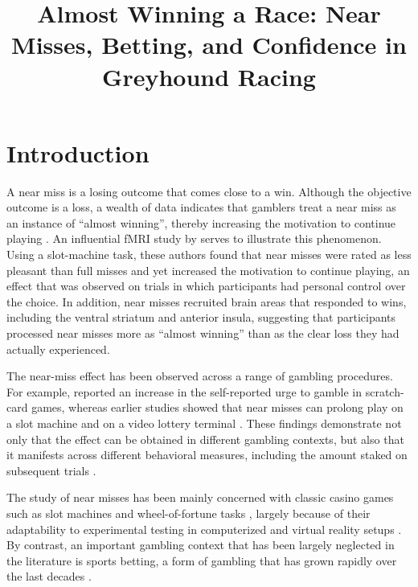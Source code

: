 \documentclass[man,floatsintext,donotrepeattitle]{apa7}
\title{Almost Winning a Race: Near Misses, Betting, and Confidence in Greyhound Racing}
\begin{document}
\maketitle

\section{Introduction}

A near miss is a losing outcome that comes close to a win. Although the objective outcome is a loss, a wealth of data indicates that gamblers treat a near miss as an instance of ``almost winning'', thereby increasing the motivation to continue playing \parencite{reid1986, dixonschreiber2004, habibdixon2010, billieux2012, barton2017}. An influential fMRI study by \textcite{clark2009} serves to illustrate this phenomenon. Using a slot-machine task, these authors found that near misses were rated as less pleasant than full misses and yet increased the motivation to continue playing, an effect that was observed on trials in which participants had personal control over the choice. In addition, near misses recruited brain areas that responded to wins, including the ventral striatum and anterior insula, suggesting that participants processed near misses more as ``almost winning'' than as the clear loss they had actually experienced.

The near-miss effect has been observed across a range of gambling procedures. For example, \textcite{stange2017} reported an increase in the self-reported urge to gamble in scratch-card games, whereas earlier studies showed that near misses can prolong play on a slot machine \parencite{kassinove2001} and on a video lottery terminal \parencite{cote2003}. These findings demonstrate not only that the effect can be obtained in different gambling contexts, but also that it manifests across different behavioral measures, including the amount staked on subsequent trials \parencite{palmer2024}.

The study of near misses has been mainly concerned with classic casino games such as slot machines \parencite{clark2009, sharman2015} and wheel-of-fortune tasks \parencite{wu2017}, largely because of their adaptability to experimental testing in computerized \parencite{clark2009, wu2015, palmer2024} and virtual reality setups \parencite{detez2019, besana2025}. By contrast, an important gambling context that has been largely neglected in the literature is sports betting, a form of gambling that has grown rapidly over the last decades \parencite{killick2019, winters2019}.
\end{document}
